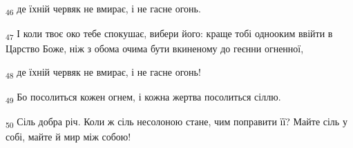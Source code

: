 \begin{tcolorbox}
\textsubscript{46} де їхній червяк не вмирає, і не гасне огонь.
\end{tcolorbox}
\begin{tcolorbox}
\textsubscript{47} І коли твоє око тебе спокушає, вибери його: краще тобі однооким ввійти в Царство Боже, ніж з обома очима бути вкиненому до геєнни огненної,
\end{tcolorbox}
\begin{tcolorbox}
\textsubscript{48} де їхній червяк не вмирає, і не гасне огонь!
\end{tcolorbox}
\begin{tcolorbox}
\textsubscript{49} Бо посолиться кожен огнем, і кожна жертва посолиться сіллю.
\end{tcolorbox}
\begin{tcolorbox}
\textsubscript{50} Сіль добра річ. Коли ж сіль несолоною стане, чим поправити її? Майте сіль у собі, майте й мир між собою!
\end{tcolorbox}
